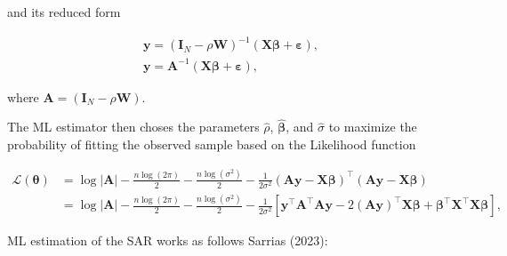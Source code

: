 \documentclass[
  letterpaper,
]{scrbook}
\begin{document}
and its reduced form

\[
\begin{split}
{\boldsymbol{\mathbf{y}}} =({\boldsymbol{\mathbf{I}}_N}-\rho {\boldsymbol{\mathbf{W}}})^{-1}({\boldsymbol{\mathbf{X}}}{\boldsymbol{\mathbf{\beta}}}+ {\boldsymbol{\mathbf{\varepsilon}}}), \\
{\boldsymbol{\mathbf{y}}} =\boldsymbol{\mathbf{A}}^{-1}({\boldsymbol{\mathbf{X}}}{\boldsymbol{\mathbf{\beta}}}+ {\boldsymbol{\mathbf{\varepsilon}}}),
\end{split}
\]

where
\(\boldsymbol{\mathbf{A}} = ({\boldsymbol{\mathbf{I}}_N}-\rho {\boldsymbol{\mathbf{W}}})\).

The ML estimator then choses the parameters \(\hat\rho\),
\(\hat{\boldsymbol{\mathbf{\beta}}}\), and \(\hat\sigma\) to maximize
the probability of fitting the observed sample based on the Likelihood
function

\[
\begin{split}
\mathcal{L} (\boldsymbol{\mathbf{\theta}}) &= \log\left| \boldsymbol{\mathbf{A}}\right| - \frac{n\log(2\pi)}{2} - \frac{n\log(\sigma^2)}{2} - \frac{1}{2\sigma^2}(\boldsymbol{\mathbf{A}}\boldsymbol{\mathbf{y}}-\boldsymbol{\mathbf{X}}\boldsymbol{\mathbf{\beta}})^\intercal (\boldsymbol{\mathbf{A}}\boldsymbol{\mathbf{y}}-\boldsymbol{\mathbf{X}}\boldsymbol{\mathbf{\beta}}) \\
&= \log\left| \boldsymbol{\mathbf{A}}\right| - \frac{n\log(2\pi)}{2} - \frac{n\log(\sigma^2)}{2} - \frac{1}{2\sigma^2}\left[\boldsymbol{\mathbf{y}}^\intercal \boldsymbol{\mathbf{A}}^\intercal\boldsymbol{\mathbf{A}}\boldsymbol{\mathbf{y}} - 2\left(\boldsymbol{\mathbf{A}}\boldsymbol{\mathbf{y}}\right)^\intercal\boldsymbol{\mathbf{X}}\boldsymbol{\mathbf{\beta }}+ \boldsymbol{\mathbf{\beta}}^\intercal\boldsymbol{\mathbf{X}}^\intercal\boldsymbol{\mathbf{X}}\boldsymbol{\mathbf{\beta}}\right],
\end{split}
\]

ML estimation of the SAR works as follows Sarrias (2023):
\end{document}
